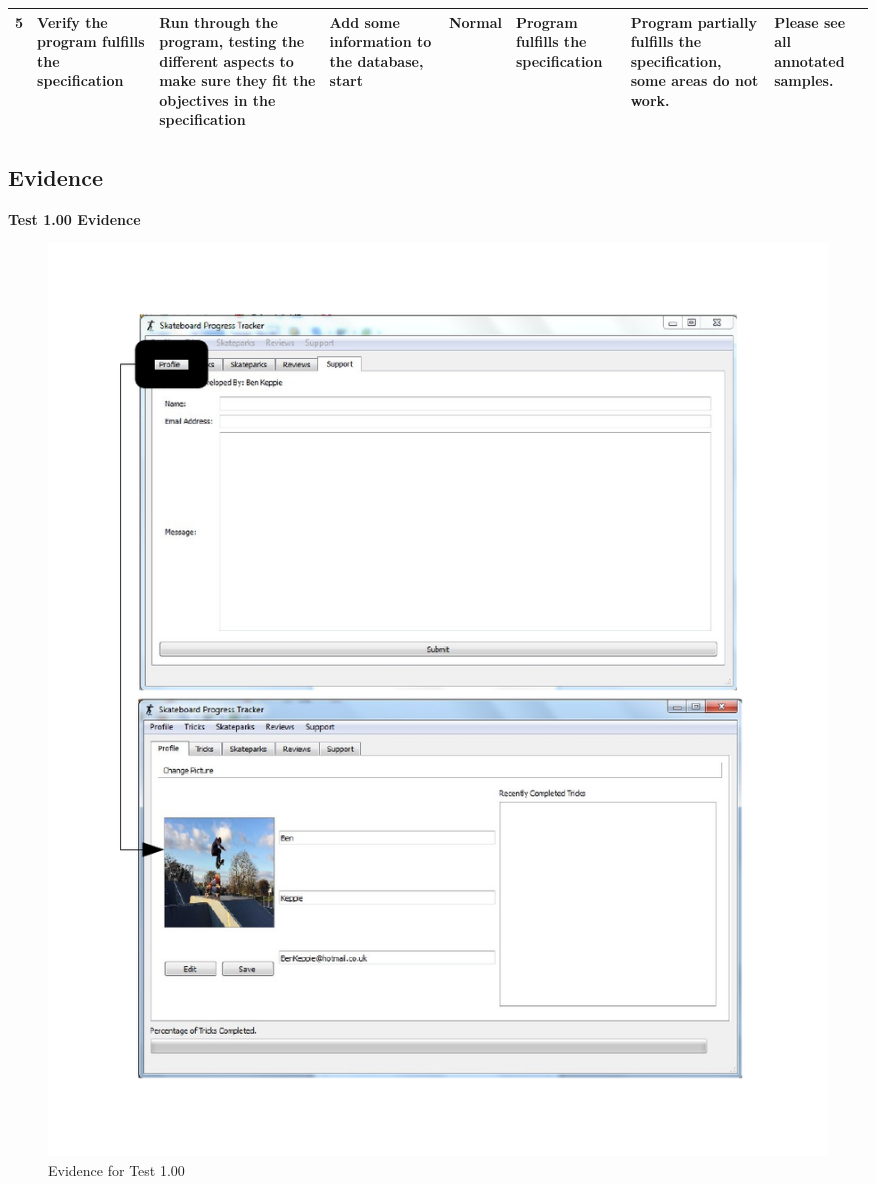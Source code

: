 \begin{landscape}
\begin{center}
\begin{longtable}{|p{1.5cm}|p{2.5cm}|p{2.5cm}|p{2cm}|p{2cm}|p{2cm}|p{2cm}|p{2cm}|}
5 & Verify the program fulfills the specification & Run through the program, testing the different aspects to make sure they fit the objectives in the specification & Add some information to the database, start & Normal & Program fulfills the specification & \textbf{Program partially fulfills the specification, some areas do not work.} & Please see all annotated samples. \\ \hline



	\end{longtable}

\end{center}
\end{landscape}


\subsection{Evidence}

\textbf{Test 1.00 Evidence}

\begin{figure}[H]
    \includegraphics[width=\textwidth]{./Testing/AnnotatedSamples/Test100.pdf}
    \caption{Evidence for Test 1.00} \label{fig:Test 1.00}
\end{figure}


